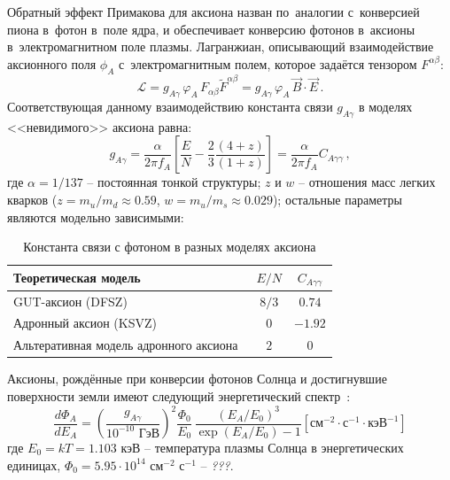 \documentclass[a4paper,article,14pt]{extarticle}
\begin{document}
Обратный эффект Примакова для аксиона назван по~аналогии с~конверсией пиона в~фотон в~поле ядра, и обеспечивает конверсию фотонов в~аксионы в~электромагнитном поле плазмы.
Лагранжиан, описывающий взаимодействие аксионного поля $\phi_A$ с~электромагнитным полем, которое задаётся тензором $F^{\alpha \beta}$:
\begin{equation}
    \mathcal{L} =
    g_{A\gamma}\, \varphi_A\, F_{\alpha\beta} \tilde{F}^{\alpha\beta} =
    g_{A\gamma}\, \varphi_A\,\vec{B} \cdot \vec{E}\, .
\end{equation}
Соответствующая данному взаимодействию константа связи $g_{A\gamma}$ в моделях <<невидимого>> аксиона равна:
\begin{equation}\label{gAy}
    g_{A\gamma} =
    \frac{\alpha}{2 \pi {f_A}}
    \left[
        \frac{E}{N} - \frac{2}{3} \frac{(4 + z)}{(1 + z)}
        \right] =
    \frac{\alpha}{2 \pi {f_A}} C_{A\gamma\gamma}\, ,
\end{equation}
где $\alpha = 1/137 $ -- постоянная тонкой структуры; $z$ и $w$ -- отношения масс легких кварков ($z = m_u/m_d \approx 0.59$, $w = m_u/m_s \approx 0.029$); остальные параметры являются модельно зависимыми:
\begin{table}[h!]
    \centering
    \begin{tabular}{|l|c|c|}
        \hline
        Теоретическая модель                                    & $E/N$ & $C_{A\gamma\gamma}$ \\
        \hline
        \hline
        GUT-аксион (DFSZ)                                       & $8/3$ & $0.74$              \\
        \hline
        Адронный аксион (KSVZ)                                  & $0$   & $-1.92$             \\
        \hline
        Альтеративная модель адронного аксиона~\cite{hadronic2} & $2$   & $0$                 \\
        \hline
    \end{tabular}
    \caption{Константа связи с фотоном в разных моделях аксиона}\label{tab:gay}
\end{table}\newline
Аксионы, рождённые при конверсии фотонов Солнца и достигнувшие поверхности земли имеют следующий энергетический спектр~\cite{solarflux1,solarflux2,solarflux3}:
\begin{equation}
    \frac{d \Phi_A}{d E_A} =
    \left(
    \frac{g_{A\gamma}}{10^{-10} \text{\ ГэВ}}
    \right)^2
    \frac{\Phi_0}{E_0}\,
    \frac{(E_A / E_0)^3}{\exp(E_A / E_0) - 1}
    \left[
        \text{см}^{-2} \cdot \text{с}^{-1} \cdot \text{кэВ}^{-1}
        \right]
\end{equation}
где ${E_0} = kT = 1.103 \text{\ кэВ}$ -- температура плазмы Солнца в энергетических единицах, ${{\Phi _0}} = 5.95 \cdot 10^{14} \text{ см} ^{-2} \text{ с} ^{-1}$ -- \emph{???}.
\end{document}
